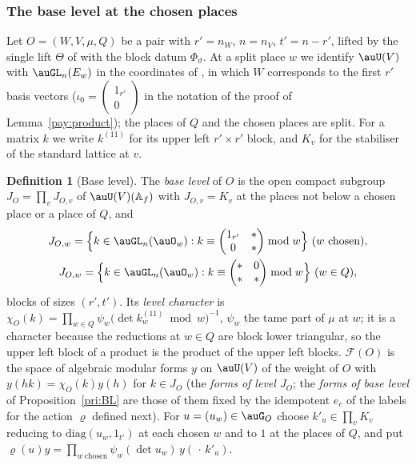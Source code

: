\documentclass[10pt]{amsart}
\theoremstyle{definition}
\newtheorem{definition}[theorem]{Definition}
\theoremstyle{remark}
\begin{document}
\subsubsection{The base level at the chosen places}\label{prm:ss-level}

Let $O=(W,V,\mu,Q)$ be a pair with $r'=n_W$, $n=n_V$, $t'=n-r'$, lifted by the single lift $\Theta$ of
{\cite[\S2.1]{P54}} with the block datum $\Phi_\vartheta$. At a split place $w$ we identify $\auU(V)$
with $\auGL_n(E_w)$ in the coordinates of {\cite[\S2.1]{P54}}, in which $W$ corresponds to the first $r'$
basis vectors ($\iota_0=\left(\begin{smallmatrix}1_{r'}\\0\end{smallmatrix}\right)$ in the notation of
the proof of Lemma~\ref{pay:product}); the places of $Q$ and the chosen places are split. For a
matrix $k$ we write $k^{(11)}$ for its upper left $r'\times r'$ block, and $K_v$ for the stabiliser of
the standard lattice at $v$.

\begin{definition}[Base level]\label{prm:def-level}
The \emph{base level} of $O$ is the open compact subgroup $J_O=\prod_vJ_{O,v}$ of $\auU(V)(\mathbb A_f)$
with $J_{O,v}=K_v$ at the places not below a chosen place or a place of $Q$, and
\[
\begin{gathered}J_{O,w}=\Bigl\{k\in\auGL_n(\auO_w):k\equiv\begin{pmatrix}1_{r'}&*\\0&*\end{pmatrix}\bmod w\Bigr\}\
(w\text{ chosen}),\\
J_{O,w}=\Bigl\{k\in\auGL_n(\auO_w):k\equiv\begin{pmatrix}*&0\\ *&*\end{pmatrix}\bmod w\Bigr\}\ (w\in Q),\end{gathered}
\]
blocks of sizes $(r',t')$. Its \emph{level character} is $\chi_O(k)=\prod_{w\in Q}\psi_w\bigl(\det
k_w^{(11)}\bmod w\bigr)^{-1}$, $\psi_w$ the tame part of $\mu$ at $w$; it is a character because the
reductions at $w\in Q$ are block lower triangular, so the upper left block of a product is the product
of the upper left blocks. $\mathcal F(O)$ is the space of algebraic modular forms $y$ on $\auU(V)$ of
the weight of $O$ with $y(hk)=\chi_O(k)y(h)$ for $k\in J_O$ (the \emph{forms of level $J_O$}; the \emph{forms of base level} of Proposition~\ref{pri:BL} are those of them fixed by the idempotent $e_c$ of the labels for the action $\varrho$ defined next). For
$u=(u_w)\in\auG_O$ choose $k'_u\in\prod_vK_v$ reducing to $\mathrm{diag}(u_w,1_{t'})$ at each chosen
$w$ and to $1$ at the places of $Q$, and put $\varrho(u)y=\prod_{w\ \mathrm{chosen}}\psi_w(\det u_w)\,
y(\,\cdot\,k'_u)$.
\end{definition}
\end{document}
